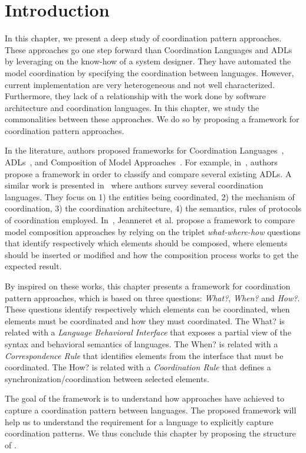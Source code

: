 \section{Introduction}
In this chapter, we present a deep study of coordination pattern approaches. These approaches go one step forward than Coordination Languages and ADLs by leveraging on the know-how of a system designer. They have automated the model coordination by specifying the coordination between languages. However, current implementation are very heterogeneous and not well characterized. Furthermore, they lack of a relationship with the work done by software architecture and coordination languages. In this chapter, we study the commonalities between these approaches. We do so by proposing a framework for coordination pattern approaches. 

In the literature, authors proposed frameworks for Coordination Languages~\cite{coordmodels}, ADLs~\cite{frameadlsbib}, and Composition of Model Approaches~\cite{framecompoas}. For example, in~\cite{frameadlsbib}, authors propose a framework in order to classify and compare several existing ADLs. A similar work is presented in~\cite{coordmodels} where authors survey several coordination languages. They focus on 1) the entities being coordinated, 2) the mechanism of
coordination, 3) the coordination architecture, 4) the semantics, rules of protocols of coordination employed. In~\cite{framecompoas}, Jeanneret et al. propose a framework to compare model
composition approaches by relying on the triplet \emph{what-where-how} questions that identify respectively which elements should be composed, where elements should be inserted or modified and how the composition process works to get the expected result. 

By inspired on these works, this chapter presents a framework for coordination pattern approaches, which is based on three questions: \emph{What?}, \emph{When?} and \emph{How?}. These questions identify respectively which elements can be coordinated, when elements must be coordinated and how they must coordinated. The What? is related with a \emph{Language Behavioral Interface} that exposes a partial view of the syntax and behavioral semantics of languages. The When? is related with a \emph{Correspondence Rule} that identifies elements from the interface that must be coordinated. The How? is related with a \emph{Coordination Rule} that defines a synchronization/coordination between selected elements. 

The goal of the framework is to understand how approaches have achieved to capture a coordination pattern between languages. The proposed framework will help us to understand the requirement for a language to explicitly capture coordination patterns. We thus conclude this chapter by proposing the structure of \bcool.  


